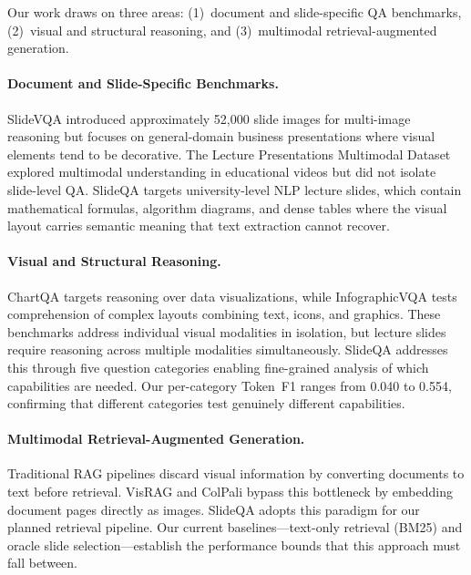 \documentclass{article} %
\begin{document}
Our work draws on three areas: (1)~document and slide-specific QA benchmarks, (2)~visual and structural reasoning, and (3)~multimodal retrieval-augmented generation.

\paragraph{Document and Slide-Specific Benchmarks.}
SlideVQA \citep{tanaka2023slidevqa} introduced approximately 52,000 slide images for multi-image reasoning but focuses on general-domain business presentations where visual elements tend to be decorative. The Lecture Presentations Multimodal Dataset \citep{lee2023lecture} explored multimodal understanding in educational videos but did not isolate slide-level QA. SlideQA targets university-level NLP lecture slides, which contain mathematical formulas, algorithm diagrams, and dense tables where the visual layout carries semantic meaning that text extraction cannot recover.

\paragraph{Visual and Structural Reasoning.}
ChartQA \citep{masry2022chartqa} targets reasoning over data visualizations, while InfographicVQA \citep{mathew2021infographicvqa} tests comprehension of complex layouts combining text, icons, and graphics. These benchmarks address individual visual modalities in isolation, but lecture slides require reasoning across multiple modalities simultaneously. SlideQA addresses this through five question categories enabling fine-grained analysis of which capabilities are needed. Our per-category Token~F1 ranges from 0.040 to 0.554, confirming that different categories test genuinely different capabilities.

\paragraph{Multimodal Retrieval-Augmented Generation.}
Traditional RAG pipelines discard visual information by converting documents to text before retrieval. VisRAG \citep{yu2024visrag} and ColPali \citep{faysse2024colpali} bypass this bottleneck by embedding document pages directly as images. SlideQA adopts this paradigm for our planned retrieval pipeline. Our current baselines---text-only retrieval (BM25) and oracle slide selection---establish the performance bounds that this approach must fall between.
\end{document}
